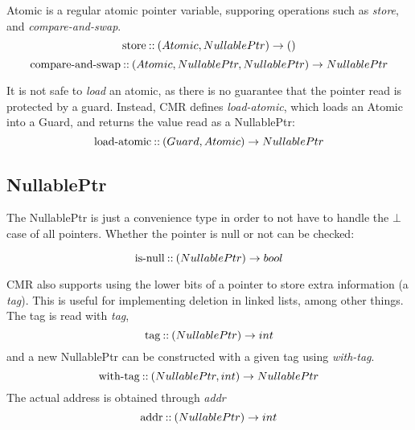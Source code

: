 Atomic is a regular atomic pointer variable, supporing operations such as \emph{store}, and
\emph{compare-and-swap}.
\begin{equation}\label{eq:atomic-store}
  \text{store\:::\:} (Atomic, NullablePtr) \to ()
\end{equation}
\begin{equation}\label{eq:atomic-cas}
  \text{compare-and-swap\:::\:} (Atomic, NullablePtr, NullablePtr) \to NullablePtr
\end{equation}

It is not safe to \emph{load} an atomic, as there is no guarantee that the
pointer read is protected by a guard. Instead, CMR defines \emph{load-atomic}, which loads an
Atomic into a Guard, and returns the value read as a NullablePtr:
\begin{equation}\label{eq:load-atomic}
  \text{load-atomic\:::\:} (Guard, Atomic) \to NullablePtr
\end{equation}

\subsection{NullablePtr}

The NullablePtr is just a convenience type in order to not have to handle the $\bot$ case of all
pointers. Whether the pointer is null or not can be checked:

\begin{equation}\label{eq:nullable-is-null}
  \text{is-null\:::\:} (NullablePtr) \to bool
\end{equation}

CMR also supports using the lower bits of a pointer to store extra information (a \emph{tag}). This
is useful for implementing deletion in linked lists, among other things.  The tag is read with
\emph{tag},
\begin{equation}\label{eq:ptr-tag}
  \text{tag\:::\:} (NullablePtr) \to int
\end{equation}
and a new NullablePtr can be constructed with a given tag using \emph{with-tag}.
\begin{equation}\label{eq:ptr-with-tag}
  \text{with-tag\:::\:} (NullablePtr, int) \to NullablePtr
\end{equation}
The actual address is obtained through \emph{addr}
\begin{equation}\label{eq:ptr-with-tag}
  \text{addr\:::\:} (NullablePtr) \to int
\end{equation}


